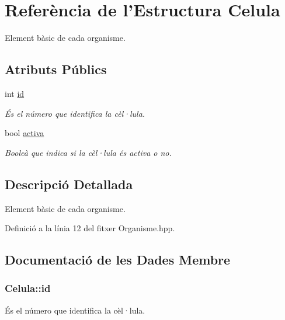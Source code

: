 \hypertarget{struct_celula}{\section{Referència de l'Estructura Celula}
\label{struct_celula}
}


Element bàsic de cada organisme.  


\subsection*{Atributs Públics}
\begin{DoxyCompactItemize}
\item 
int \hyperlink{struct_celula_a30cd8be20156f6276eb9cc0b47a1f83a}{id}
\begin{DoxyCompactList}\small\item\em És el número que identifica la cèl·lula. \end{DoxyCompactList}\item 
bool \hyperlink{struct_celula_ad9c2e6f0c72719aa73b472bb44434098}{activa}
\begin{DoxyCompactList}\small\item\em Booleà que indica si la cèl·lula és activa o no. \end{DoxyCompactList}\end{DoxyCompactItemize}


\subsection{Descripció Detallada}
Element bàsic de cada organisme. 

Definició a la línia 12 del fitxer Organisme.\-hpp.



\subsection{Documentació de les Dades Membre}
\hypertarget{struct_celula_a30cd8be20156f6276eb9cc0b47a1f83a}{
\subsubsection[{id}]{\setlength{\rightskip}{0pt plus 5cm}Celula\-::id}}\label{struct_celula_a30cd8be20156f6276eb9cc0b47a1f83a}


És el número que identifica la cèl·lula. 



